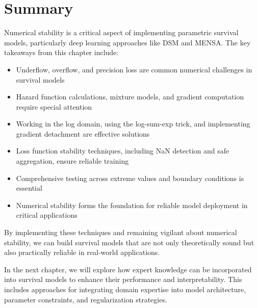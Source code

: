 \section{Summary}

Numerical stability is a critical aspect of implementing parametric survival models, particularly deep learning approaches like DSM and MENSA. The key takeaways from this chapter include:

\begin{itemize}
    \item Underflow, overflow, and precision loss are common numerical challenges in survival models
    \item Hazard function calculations, mixture models, and gradient computation require special attention
    \item Working in the log domain, using the log-sum-exp trick, and implementing gradient detachment are effective solutions
    \item Loss function stability techniques, including NaN detection and safe aggregation, ensure reliable training
    \item Comprehensive testing across extreme values and boundary conditions is essential
    \item Numerical stability forms the foundation for reliable model deployment in critical applications
\end{itemize}

By implementing these techniques and remaining vigilant about numerical stability, we can build survival models that are not only theoretically sound but also practically reliable in real-world applications.

\begin{notebox}[title=Looking Ahead]
In the next chapter, we will explore how expert knowledge can be incorporated into survival models to enhance their performance and interpretability. This includes approaches for integrating domain expertise into model architecture, parameter constraints, and regularization strategies.
\end{notebox}
